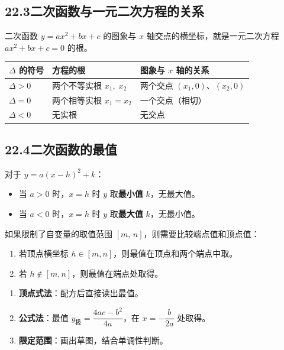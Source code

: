 \documentclass[12pt, a4paper]{ctexart}
\begin{document}
\subsection*{22.3\quad 二次函数与一元二次方程的关系}

\begin{knowledgebox}[二次函数与方程的关系]
二次函数 $y = ax^2+bx+c$ 的图象与 $x$ 轴交点的横坐标，就是一元二次方程 $ax^2+bx+c=0$ 的根。
\medskip
\begin{tabular}{l|l|l}
\toprule
$\Delta$ 的符号 & 方程的根 & 图象与 $x$ 轴的关系 \\
\midrule
$\Delta > 0$ & 两个不等实根 $x_1,\;x_2$ & 两个交点 $(x_1,0)$、$(x_2,0)$ \\
$\Delta = 0$ & 两个相等实根 $x_1=x_2$ & 一个交点（相切） \\
$\Delta < 0$ & 无实根 & 无交点 \\
\bottomrule
\end{tabular}
\end{knowledgebox}

\subsection*{22.4\quad 二次函数的最值}

\begin{knowledgebox}[二次函数的最值]
对于 $y = a(x-h)^2+k$：
\begin{itemize}[leftmargin=*]
  \item 当 $a > 0$ 时，$x=h$ 时 $y$ 取\textbf{最小值} $k$，无最大值。
  \item 当 $a < 0$ 时，$x=h$ 时 $y$ 取\textbf{最大值} $k$，无最小值。
\end{itemize}
\medskip
如果限制了自变量的取值范围 $[m,\,n]$，则需要比较端点值和顶点值：
\begin{enumerate}[leftmargin=*]
  \item 若顶点横坐标 $h \in [m,n]$，则最值在顶点和两个端点中取。
  \item 若 $h \notin [m,n]$，则最值在端点处取得。
\end{enumerate}
\end{knowledgebox}

\begin{tipbox}[求最值的方法总结]
\begin{enumerate}[leftmargin=*]
  \item \textbf{顶点式法}：配方后直接读出最值。
  \item \textbf{公式法}：最值 $y_{\text{极}} = \dfrac{4ac-b^2}{4a}$，在 $x=-\dfrac{b}{2a}$ 处取得。
  \item \textbf{限定范围}：画出草图，结合单调性判断。
\end{enumerate}
\end{tipbox}
\end{document}
